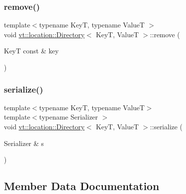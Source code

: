 \mbox{\label{structvt_1_1location_1_1_directory_a85c59bd87eecbfabcbd7941e1c1929ae}} 
\subsubsection{\texorpdfstring{remove()}{remove()}}
{\footnotesize\ttfamily template$<$typename KeyT, typename ValueT $>$ \\
void \hyperlink{structvt_1_1location_1_1_directory}{vt\+::location\+::\+Directory}$<$ KeyT, ValueT $>$\+::remove (\begin{DoxyParamCaption}\item[{KeyT const \&}]{key }\end{DoxyParamCaption})}

\mbox{\label{structvt_1_1location_1_1_directory_a78fb8d36b1ca041d03ddc22dcbb907ad}} 
\subsubsection{\texorpdfstring{serialize()}{serialize()}}
{\footnotesize\ttfamily template$<$typename KeyT, typename ValueT$>$ \\
template$<$typename Serializer $>$ \\
void \hyperlink{structvt_1_1location_1_1_directory}{vt\+::location\+::\+Directory}$<$ KeyT, ValueT $>$\+::serialize (\begin{DoxyParamCaption}\item[{Serializer \&}]{s }\end{DoxyParamCaption})\hspace{0.3cm}{\ttfamily [inline]}}



\subsection{Member Data Documentation}
\mbox{\label{structvt_1_1location_1_1_directory_a8febd5f13d21274bce41021ba2a3da03}} 

